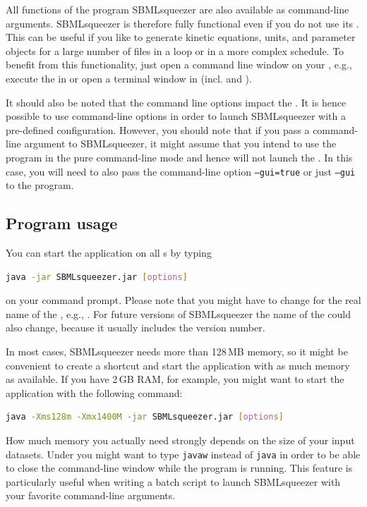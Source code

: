 All functions of the program SBMLsqueezer are also available as command-line
arguments. SBMLsqueezer is therefore fully functional even if you do not use
its \GUI.
This can be useful if you like to generate kinetic equations, units, and
parameter objects for a large number of \SBML files in a loop or in a more
complex schedule.
To benefit from this functionality, just open a command line window on your
\OS, e.g., execute the  in \Windows or open a terminal window
in \Unix (incl. \Linux and \MacOSX).

It should also be noted that the command line options impact the \GUI.
It is hence possible to use command-line options in order to launch
SBMLsqueezer with a pre-defined configuration.
However, you should note that if you pass a command-line argument to SBMLsqueezer, it might assume that you intend to use the program in the pure command-line mode and hence will not launch the \GUI.
In this case, you will need to also pass the command-line option  \texttt{--gui=true} or just \texttt{--gui} to the program.

\subsection{Program usage}
\label{sec:Program_usage}

You can start the application on all {\OS}s by typing
\begin{lstlisting}[language=bash, numbers=none, caption={Launching SBMLsqueezer from the command-line}]
java -jar SBMLsqueezer.jar [options]
\end{lstlisting}
on your command prompt. Please note that you might have to change
 for the real name of the \JAR, e.g.,
.
For future versions of SBMLsqueezer the name of the
\JAR could also change, because it usually includes the version number.

In most cases, SBMLsqueezer needs more than 128\,MB memory, so it might be convenient to create a
shortcut and start the application with as much memory as available. If you
have 2\,GB RAM, for example, you might want to start the application with the
following command:
\begin{lstlisting}[language=bash, numbers=none, caption={Launching SBMLsqueezer from the command-line with increased heap size}]
java -Xms128m -Xmx1400M -jar SBMLsqueezer.jar [options]
\end{lstlisting}
How much memory you actually need strongly depends on the size of your input datasets.
Under \Windows you might want to type \texttt{javaw} instead of \texttt{java} in order to be able to close
the command-line window while the program is running.
This feature is particularly useful when writing a batch script to launch SBMLsqueezer with your favorite command-line arguments.

